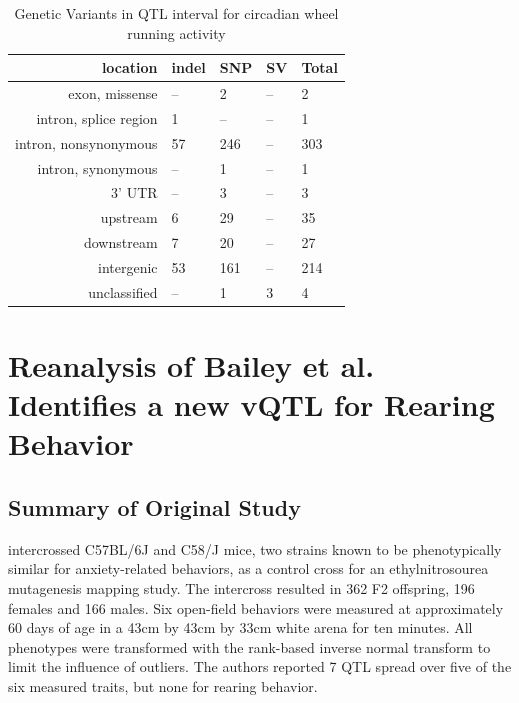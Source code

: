     \begin{table}
        \centering
        \begin{tabular}{rllll}
            \hline  
            \textbf{location}       & \textbf{indel}     & \textbf{SNP}   & \textbf{SV}    & \textbf{Total} \\
            \hline      
            exon, missense          & --        & 2     & --    & 2     \\
            intron, splice region   & 1         & --    & --    & 1     \\
            intron, nonsynonymous   & 57        & 246   & --    & 303   \\
            intron, synonymous      & --        & 1     & --    & 1     \\
            3' UTR                  & --        & 3     & --    & 3     \\
            upstream                & 6         & 29    & --    & 35    \\
            downstream              & 7         & 20    & --    & 27    \\
            intergenic              & 53        & 161   & --    & 214   \\
            unclassified            & --        & 1     & 3     & 4     \\
            \hline
        \end{tabular}
        \caption{Genetic Variants in QTL interval for circadian wheel running activity}
        \label{tab:kumar_variants}
    \end{table}


\section{Reanalysis of Bailey et al. Identifies a new vQTL for Rearing Behavior}

    \subsection{Summary of Original Study}
    \citet{Bailey2008} intercrossed C57BL/6J and C58/J mice, two strains known to be phenotypically similar for anxiety-related behaviors, as a control cross for an ethylnitrosourea mutagenesis mapping study.
    The intercross resulted in 362 F2 offspring, 196 females and 166 males.
    Six open-field behaviors were measured at approximately 60 days of age in a 43cm by 43cm by 33cm white arena for ten minutes.
    All phenotypes were transformed with the rank-based inverse normal transform to limit the influence of outliers.
    The authors reported 7 QTL spread over five of the six measured traits, but none for rearing behavior.


